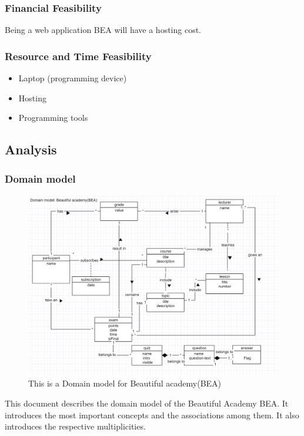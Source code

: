 \documentclass{scrartcl}
\begin{document}
 \subsubsection{Financial Feasibility}
 Being a web application BEA will have a hosting cost.
 \subsubsection{Resource and Time Feasibility}
 \begin{itemize}
 \item Laptop (programming device)
 \item Hosting
 \item Programming tools
 \end{itemize}
 


\subsection{Analysis} 	 
\subsubsection{Domain model}  
\begin{figure}[h]
\centering
\includegraphics[width=150mm]{domain-in-use.JPG}
\caption{This is a Domain model for Beautiful academy(BEA)}
\label{Life Cycle Models}
\end{figure}

This document describes the domain model of the Beautiful Academy BEA. It introduces the most important concepts and the associations among them. It also introduces the respective multiplicities. \\
\end{document}
